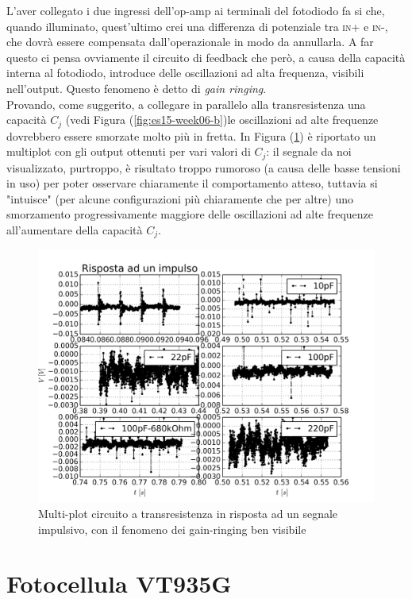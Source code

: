 \documentclass[journal, a4paper]{IEEEtran}
\begin{document}
L'aver collegato i due ingressi dell'op-amp ai terminali del fotodiodo fa si che, quando illuminato, quest'ultimo crei una differenza di potenziale tra \textsc{in+} e \textsc{in-}, che dovrà essere compensata dall'operazionale in modo da annullarla. A far questo ci pensa ovviamente il circuito di feedback che però, a causa della capacità interna al fotodiodo, introduce delle oscillazioni ad alta frequenza, visibili nell'output. Questo fenomeno è detto di \textit{gain ringing}.\\
Provando, come suggerito, a collegare in parallelo alla transresistenza una capacità $C_j$ (vedi Figura (\ref{fig:es15-week06-b})le oscillazioni ad alte frequenze dovrebbero essere smorzate molto più in fretta. In Figura (\ref{fig:rispo_impulso_multiplot}) è riportato un multiplot con gli output ottenuti per vari valori di $C_j$: il segnale da noi visualizzato, purtroppo, è risultato troppo rumoroso (a causa delle basse tensioni in uso) per poter osservare chiaramente il comportamento atteso, tuttavia si "intuisce" (per alcune configurazioni più chiaramente che per altre) uno smorzamento progressivamente maggiore delle oscillazioni ad alte frequenze all'aumentare della capacità $C_j$.

\begin{figure}
\centering
\includegraphics[width=0.9\linewidth]{./rispo_impulso_multiplot}
\caption{Multi-plot circuito a transresistenza in risposta ad un segnale impulsivo, con il fenomeno dei gain-ringing ben visibile}
\label{fig:rispo_impulso_multiplot}
\end{figure}



\section{Fotocellula VT935G}
\end{document}
